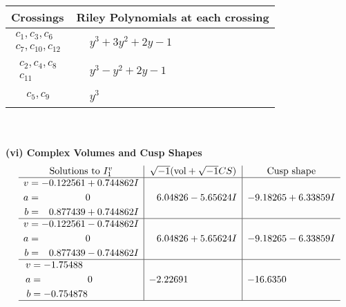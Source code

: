 \documentclass[1p]{elsarticle_modified}
\theoremstyle{definition}
\newcommand{\I}{\sqrt{-1}}
\begin{document}
\begin{tabular}{m{50pt}|m{274pt}}
Crossings & \hspace{64pt}Riley Polynomials at each crossing \\
\hline $$\begin{aligned}c_{1},c_{3},c_{6}\\c_{7},c_{10},c_{12}\end{aligned}$$&$\begin{aligned}
&y^3+3 y^2+2 y-1
\end{aligned}$\\
\hline $$\begin{aligned}c_{2},c_{4},c_{8}\\c_{11}\end{aligned}$$&$\begin{aligned}
&y^3- y^2+2 y-1
\end{aligned}$\\
\hline $$\begin{aligned}c_{5},c_{9}\end{aligned}$$&$\begin{aligned}
&y^3
\end{aligned}$\\
\hline
\end{tabular}\\~\\
\newpage\flushleft \textbf{(vi) Complex Volumes and Cusp Shapes}
$$\begin{array}{c|c|c}  
\text{Solutions to }I^v_{1}& \I (\text{vol} + \sqrt{-1}CS) & \text{Cusp shape}\\
 \hline 
\begin{aligned}
v &= -0.122561 + 0.744862 I \\
a &= \phantom{-0.000000 } 0 \\
b &= \phantom{-}0.877439 + 0.744862 I\end{aligned}
 & \phantom{-}6.04826 - 5.65624 I & -9.18265 + 6.33859 I \\ \hline\begin{aligned}
v &= -0.122561 - 0.744862 I \\
a &= \phantom{-0.000000 } 0 \\
b &= \phantom{-}0.877439 - 0.744862 I\end{aligned}
 & \phantom{-}6.04826 + 5.65624 I & -9.18265 - 6.33859 I \\ \hline\begin{aligned}
v &= -1.75488\phantom{ +0.000000I} \\
a &= \phantom{-0.000000 } 0 \\
b &= -0.754878\phantom{ +0.000000I}\end{aligned}
 & -2.22691\phantom{ +0.000000I} & -16.6350\phantom{ +0.000000I}\\
 \hline 
 \end{array}$$\newpage\newpage\renewcommand{\arraystretch}{1}
\end{document}
